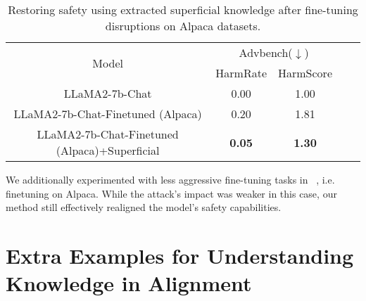\begin{table*}[h]
\begin{center}
\begin{tabular}{ccccc}
\toprule
\multirow{2}{*}{Model} &\multicolumn{2}{c}{Advbench($\downarrow$)}  \\
~& HarmRate & HarmScore \\
\midrule
LLaMA2-7b-Chat                                  & 0.00 & 1.00 \\
LLaMA2-7b-Chat-Finetuned (Alpaca)	            & 0.20 & 1.81  \\
LLaMA2-7b-Chat-Finetuned (Alpaca)+Superficial	& \textbf{0.05} & \textbf{1.30} \\
\bottomrule
\end{tabular}
\end{center}
\caption{Restoring safety using extracted superficial knowledge after fine-tuning disruptions on Alpaca datasets.}\label{tab:plug_other}
\end{table*}
We additionally experimented with less aggressive fine-tuning tasks in ~\cite{alignattack}, i.e. finetuning on Alpaca. While the attack’s impact was weaker in this case, our method still effectively realigned the model’s safety capabilities.

\section{Extra Examples for Understanding Knowledge in Alignment}\label{app:example}

